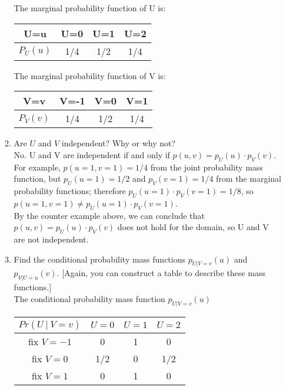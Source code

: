\documentclass[11pt]{article}
\begin{document}
\begin{enumerate}[label=\textbf{Question \arabic*:},start=1]
\begin{enumerate}
	The marginal probability function of U is:
\begin{center}
 \begin{tabular}{|| c c c c ||} 
 \hline
 U=u & U=0 & U=1 & U=2 \\ [0.5ex] 
 \hline\hline
 $P_{U}(u)$ & 1/4 & 1/2 & 1/4  \\ 
 \hline
\end{tabular}
\end{center}

	The marginal probability function of V is:
\begin{center}
 \begin{tabular}{|| c c c c ||} 
 \hline
 V=v & V=-1 & V=0 & V=1 \\ [0.5ex] 
 \hline\hline
 $P_{V}(v)$ & 1/4 & 1/2 & 1/4  \\ 
 \hline
\end{tabular}
\end{center}

	\item Are $U$ and $V$ independent? Why or why not?\\
	
	No. U and V are independent if and only if $p(u,v) = p_U(u) \cdot p_V(v)$. \\
	
	For example, $p(u=1, v=1) = 1/4$ from the joint probability mass function, but $p_U(u=1) = 1/2$ and $p_V(v=1) = 1/4$ from the marginal probability functions; therefore $p_U(u=1) \cdot p_V(v=1) = 1/8$, so $p(u = 1, v = 1) \neq p_U(u=1) \cdot p_V(v=1) $. \\
	
	By the counter example above, we can conclude that $p(u, v) = p_U(u) \cdot p_V(v)$ does not hold for the domain, so U and V are not independent.\\
	

	\item Find the conditional probability mass functions $p_{U|V = v}(u)$ and $p_{V|U=u}(v)$. [Again, you can construct a table to describe these mass functions.]\\
	
	The conditional probability mass function $p_{U | V=v}(u)$
\begin{center}
 \begin{tabular}{|| c c c c ||} 
 \hline
 $Pr(U\ | \ V= v)$ & $U=0$ & $U=1$ & $U=2$ \\ [0.5ex] 
 \hline\hline
 fix $V=-1$ & 0 & 1 & 0  \\ 
 \hline
 fix $V=0$ & 1/2 & 0 & 1/2  \\
 \hline
 fix $V=1$ & 0 & 1 & 0 \\
 \hline
\end{tabular}
\end{center}


\end{enumerate}
\end{enumerate}
\end{document}

